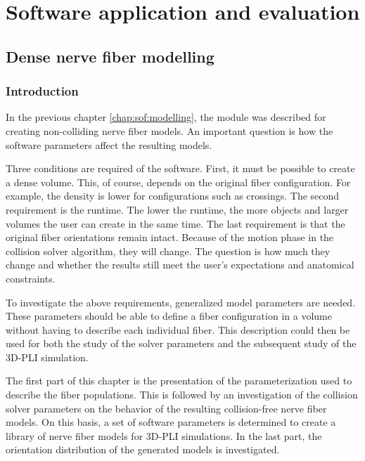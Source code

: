 \newpage\null\thispagestyle{empty}\newpage
\clearpage{\thispagestyle{empty}\cleardoublepage}
\part{Software application and evaluation}
\parttoc
% 
% 
% 
\setcounter{chapter}{7}
\chapter{Dense nerve fiber modelling}
\label{cha:model_analysis}
% 
\section{Introduction}
%
In the previous chapter \cref{chap:sof:modelling}, the module  was described for creating non-colliding nerve fiber models.
An important question is how the software parameters affect the resulting models.
\par
%
Three conditions are required of the software.
First, it must be possible to create a dense volume.
This, of course, depends on the original fiber configuration.
For example, the density is lower for configurations such as crossings.
The second requirement is the runtime.
The lower the runtime, the more objects and larger volumes the user can create in the same time.
The last requirement is that the original fiber orientations remain intact.
Because of the motion phase in the collision solver algorithm, they will change.
The question is how much they change and whether the results still meet the user's expectations and anatomical constraints.
\par
%
To investigate the above requirements, generalized model parameters are needed.
These parameters should be able to define a fiber configuration in a volume without having to describe each individual fiber.
This description could then be used for both the study of the solver parameters and the subsequent study of the \ac{3D-PLI} simulation.
\par
%
The first part of this chapter is the presentation of the parameterization used to describe the fiber populations.
This is followed by an investigation of the collision solver parameters on the behavior of the resulting collision-free nerve fiber models.
On this basis, a set of software parameters is determined to create a library of nerve fiber models for \ac{3D-PLI} simulations.
In the last part, the orientation distribution of the generated models is investigated.
%
%
%
